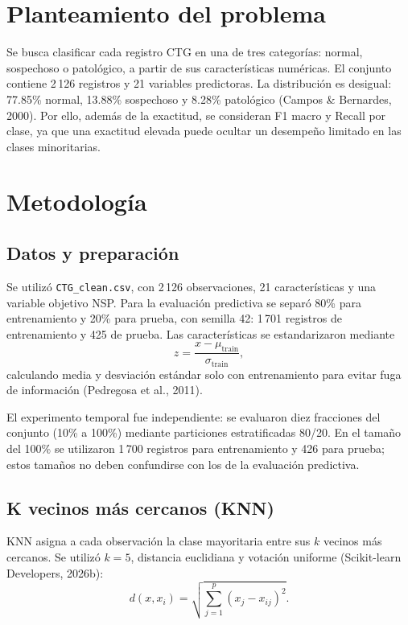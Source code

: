 \documentclass[10pt,letterpaper,twocolumn]{article}
\begin{document}
\section{Planteamiento del problema}
Se busca clasificar cada registro CTG en una de tres categorías: normal, sospechoso o patológico, a partir de sus características numéricas. El conjunto contiene 2\,126 registros y 21 variables predictoras. La distribución es desigual: 77.85\% normal, 13.88\% sospechoso y 8.28\% patológico (Campos \& Bernardes, 2000). Por ello, además de la exactitud, se consideran F1 macro y Recall por clase, ya que una exactitud elevada puede ocultar un desempeño limitado en las clases minoritarias.

\section{Metodología}
\subsection{Datos y preparación}
Se utilizó \texttt{CTG\_clean.csv}, con 2\,126 observaciones, 21 características y una variable objetivo NSP. Para la evaluación predictiva se separó 80\% para entrenamiento y 20\% para prueba, con semilla 42: 1\,701 registros de entrenamiento y 425 de prueba. Las características se estandarizaron mediante
\[
z=\frac{x-\mu_{\mathrm{train}}}{\sigma_{\mathrm{train}}},
\]
calculando media y desviación estándar solo con entrenamiento para evitar fuga de información (Pedregosa et al., 2011).

El experimento temporal fue independiente: se evaluaron diez fracciones del conjunto (10\% a 100\%) mediante particiones estratificadas 80/20. En el tamaño del 100\% se utilizaron 1\,700 registros para entrenamiento y 426 para prueba; estos tamaños no deben confundirse con los de la evaluación predictiva.

\subsection{K vecinos más cercanos (KNN)}
KNN asigna a cada observación la clase mayoritaria entre sus $k$ vecinos más cercanos. Se utilizó $k=5$, distancia euclidiana y votación uniforme (Scikit-learn Developers, 2026b):
\[
d(x,x_i)=\sqrt{\sum_{j=1}^{p}(x_j-x_{ij})^2}.
\]
\end{document}
